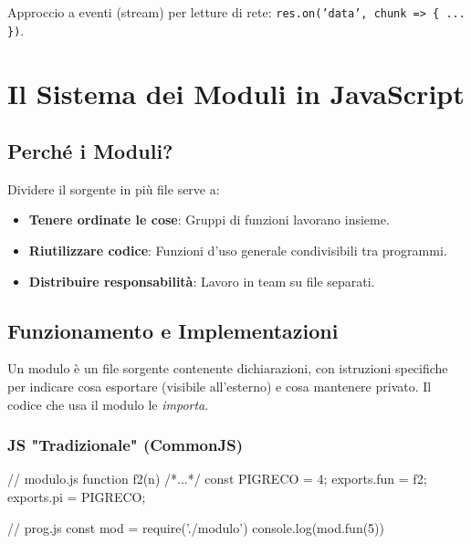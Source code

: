 Approccio a eventi (stream) per letture di rete: \texttt{res.on('data', chunk => \{ ... \})}.

\section{Il Sistema dei Moduli in JavaScript}
\subsection{Perché i Moduli?}
Dividere il sorgente in più file serve a:
\begin{itemize}
    \item \textbf{Tenere ordinate le cose}: Gruppi di funzioni lavorano insieme.
    \item \textbf{Riutilizzare codice}: Funzioni d'uso generale condivisibili tra programmi.
    \item \textbf{Distribuire responsabilità}: Lavoro in team su file separati.
\end{itemize}

\subsection{Funzionamento e Implementazioni}
Un modulo è un file sorgente contenente dichiarazioni, con istruzioni specifiche per indicare cosa esportare (visibile all'esterno) e cosa mantenere privato. Il codice che usa il modulo le \emph{importa}.

\begin{center}
\end{center}

\subsubsection{JS "Tradizionale" (CommonJS)}
\begin{jsbox}[title={Implementazione Require/Exports}]
// modulo.js
function f2(n) { /*...*/ }
const PIGRECO = 4;
exports.fun = f2;
exports.pi = PIGRECO;

// prog.js
const mod = require('./modulo')
console.log(mod.fun(5))
\end{jsbox}

